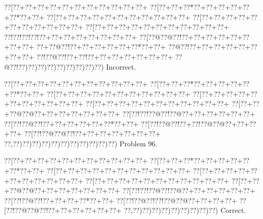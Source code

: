 \documentclass[a5paper]{article}
\begin{document}
\begin{center}
{\goo
\0??[\0??+\0??+\0??+\0??+\0??+\0??+\0??+\0??+\0??+\0??+\0??+
\0??[\0??+\0??+\0??*\0??+\0??+\0??+\0??+\0??+\0??*\0??+\0??+
\0??[\0??+\0??+\0??+\0??+\0??+\0??+\0??+\0??+\0??+\0??+\0??+
\0??[\0??+\0??+\0??+\0??+\0??+\0??+\0??+\0??+\0??+\0??+\0??+
\0??[\0??+\0??+\0??+\0??+\0??+\0??+\0??+\0??+\0??+\0??+\0??+
\0??!\0??!\0??!\0??!\0??+\0??+\0??+\0??+\0??+\0??+\0??+\0??+
\0??[\0??@\0??@\0??!\0??+\0??+\0??+\0??+\0??+\0??+\0??+\0??+
\0??+\0??@\0??!\0??+\0??+\0??+\0??+\0??+\0??*\0??+\0??+
\0??@\0??!\0??+\0??+\0??+\0??+\0??+\0??+\0??+\0??+
\0??!\0??@\0??!\0??+\0??!\0??+\0??+\0??+\0??+\0??+\0??+\0??+
\0??@\0??!\0??)\0??)\0??)\0??)\0??)\0??)\0??)\0??)\0??)
}
Incorrect. 

\end{center}
\newpage
\begin{center}
{\goo
\0??[\0??+\0??+\0??+\0??+\0??+\0??+\0??+\0??+\0??+\0??+\0??+
\0??[\0??+\0??+\0??*\0??+\0??+\0??+\0??+\0??+\0??*\0??+\0??+
\0??[\0??+\0??+\0??+\0??+\0??+\0??+\0??+\0??+\0??+\0??+\0??+
\0??[\0??+\0??+\0??+\0??+\0??+\0??+\0??+\0??+\0??+\0??+\0??+
\0??[\0??+\0??+\0??+\0??+\0??+\0??+\0??+\0??+\0??+\0??+\0??+
\0??[\0??+\0??+\0??@\0??@\0??+\0??+\0??+\0??+\0??+\0??+\0??+
\0??[\0??!\0??!\0??@\0??!\0??@\0??+\0??+\0??+\0??+\0??+\0??+
\0??[\0??!\0??@\0??!\0??+\0??+\0??+\0??+\0??+\0??*\0??+\0??+
\0??[\0??!\0??@\0??!\0??+\0??!\0??@\0??@\0??+\0??+\0??+\0??+
\0??[\0??!\0??@\0??@\0??!\0??+\0??+\0??+\0??+\0??+\0??+\0??+
\0??,\0??)\0??)\0??)\0??)\0??)\0??)\0??)\0??)\0??)\0??)\0??)
}
Problem 96.

\end{center}
\begin{center}
{\goo
\0??[\0??+\0??+\0??+\0??+\0??+\0??+\0??+\0??+\0??+\0??+\0??+
\0??[\0??+\0??+\0??*\0??+\0??+\0??+\0??+\0??+\0??*\0??+\0??+
\0??[\0??+\0??+\0??+\0??+\0??+\0??+\0??+\0??+\0??+\0??+\0??+
\0??[\0??+\0??+\0??+\0??+\0??+\0??+\0??+\0??+\0??+\0??+\0??+
\0??[\0??+\0??+\0??+\0??+\0??+\0??+\0??+\0??+\0??+\0??+\0??+
\0??[\0??+\0??+\0??@\0??@\0??+\0??+\0??+\0??+\0??+\0??+\0??+
\0??[\0??!\0??!\0??@\0??!\0??@\0??+\0??+\0??+\0??+\0??+\0??+
\0??[\0??!\0??@\0??!\0??+\0??+\0??+\0??*\0??+\0??+
\0??[\0??!\0??@\0??!\0??!\0??@\0??@\0??+\0??+\0??+\0??+
\0??[\0??!\0??@\0??@\0??!\0??+\0??+\0??+\0??+\0??+\0??+
\0??,\0??)\0??)\0??)\0??)\0??)\0??)\0??)\0??)\0??)
}
Correct. 

\end{center}
\end{document}
